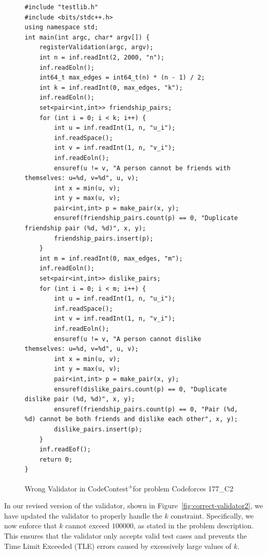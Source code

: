 \documentclass[11pt]{article}
\newcommand{\pl}{\textsuperscript{+}}
\begin{document}
\begin{figure}[t]
\centering
\begin{minipage}{0.95\textwidth}
\begin{lstlisting}
#include "testlib.h"
#include <bits/stdc++.h>
using namespace std;
int main(int argc, char* argv[]) {
    registerValidation(argc, argv);
    int n = inf.readInt(2, 2000, "n");
    inf.readEoln();
    int64_t max_edges = int64_t(n) * (n - 1) / 2;
    int k = inf.readInt(0, max_edges, "k");
    inf.readEoln();
    set<pair<int,int>> friendship_pairs;
    for (int i = 0; i < k; i++) {
        int u = inf.readInt(1, n, "u_i");
        inf.readSpace();
        int v = inf.readInt(1, n, "v_i");
        inf.readEoln();
        ensuref(u != v, "A person cannot be friends with themselves: u=%d, v=%d", u, v);
        int x = min(u, v);
        int y = max(u, v);
        pair<int,int> p = make_pair(x, y);
        ensuref(friendship_pairs.count(p) == 0, "Duplicate friendship pair (%d, %d)", x, y);
        friendship_pairs.insert(p);
    }
    int m = inf.readInt(0, max_edges, "m");
    inf.readEoln();
    set<pair<int,int>> dislike_pairs;
    for (int i = 0; i < m; i++) {
        int u = inf.readInt(1, n, "u_i");
        inf.readSpace();
        int v = inf.readInt(1, n, "v_i");
        inf.readEoln();
        ensuref(u != v, "A person cannot dislike themselves: u=%d, v=%d", u, v);
        int x = min(u, v);
        int y = max(u, v);
        pair<int,int> p = make_pair(x, y);
        ensuref(dislike_pairs.count(p) == 0, "Duplicate dislike pair (%d, %d)", x, y);
        ensuref(friendship_pairs.count(p) == 0, "Pair (%d, %d) cannot be both friends and dislike each other", x, y);
        dislike_pairs.insert(p);
    }
    inf.readEof();
    return 0;
}
\end{lstlisting}
\end{minipage}
\caption{Wrong Validator in CodeContest\pl for problem Codeforces 177\_{C2}}
\label{fig:wrong-validator2}
\end{figure}

In our revised version of the validator, shown in Figure~\ref{fig:correct-validator2}, we have updated the validator to properly handle the $k$ constraint. Specifically, we now enforce that $k$ cannot exceed $100000$, as stated in the problem description. This ensures that the validator only accepts valid test cases and prevents the Time Limit Exceeded (TLE) errors caused by excessively large values of $k$.
\end{document}
